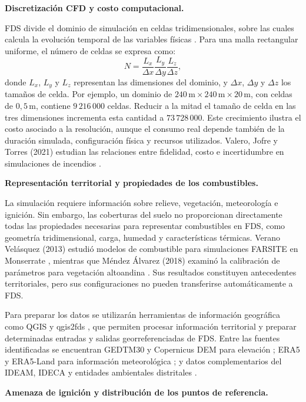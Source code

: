 \textbf{Discretización CFD y costo computacional.}

FDS divide el dominio de simulación en celdas tridimensionales, sobre las cuales calcula la evolución temporal de las variables físicas \cite{fdsnist}. Para una malla rectangular uniforme, el número de celdas se expresa como:
\[
N=\frac{L_x}{\Delta x}
  \frac{L_y}{\Delta y}
  \frac{L_z}{\Delta z},
\]
donde $L_x$, $L_y$ y $L_z$ representan las dimensiones del dominio, y $\Delta x$, $\Delta y$ y $\Delta z$ los tamaños de celda. Por ejemplo, un dominio de $240\,\mathrm{m}\times240\,\mathrm{m}\times20\,\mathrm{m}$, con celdas de $0{,}5\,\mathrm{m}$, contiene $9\,216\,000$ celdas. Reducir a la mitad el tamaño de celda en las tres dimensiones incrementa esta cantidad a $73\,728\,000$. Este crecimiento ilustra el costo asociado a la resolución, aunque el consumo real depende también de la duración simulada, configuración física y recursos utilizados. Valero, Jofre y Torres (2021) estudian las relaciones entre fidelidad, costo e incertidumbre en simulaciones de incendios \cite{valero2021}.

\textbf{Representación territorial y propiedades de los combustibles.}

La simulación requiere información sobre relieve, vegetación, meteorología e ignición. Sin embargo, las coberturas del suelo no proporcionan directamente todas las propiedades necesarias para representar combustibles en FDS, como geometría tridimensional, carga, humedad y características térmicas. Verano Velásquez (2013) estudió modelos de combustible para simulaciones FARSITE en Monserrate \cite{verano2013}, mientras que Méndez Álvarez (2018) examinó la calibración de parámetros para vegetación altoandina \cite{mendez2018}. Sus resultados constituyen antecedentes territoriales, pero sus configuraciones no pueden transferirse automáticamente a FDS.

Para preparar los datos se utilizarán herramientas de información geográfica como QGIS \cite{vfpQGIS} y qgis2fds \cite{vfpQGIS2FDS}, que permiten procesar información territorial y preparar determinadas entradas y salidas georreferenciadas de FDS. Entre las fuentes identificadas se encuentran GEDTM30 y Copernicus DEM para elevación \cite{vfpGEDTM30,vfpCopernicusDEM}; ERA5 y ERA5-Land para información meteorológica \cite{vfpERA5Datos,vfpERA5LandDatos}; y datos complementarios del IDEAM, IDECA y entidades ambientales distritales \cite{vfpIDEAMDHIME,vfpIDECABogota,vfpSDAVisor,vfpJBBCoberturas}.

\textbf{Amenaza de ignición y distribución de los puntos de referencia.}


